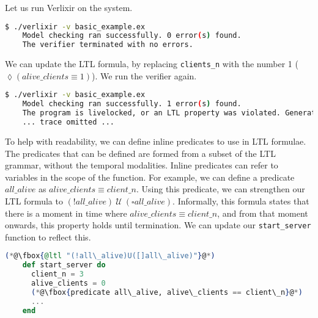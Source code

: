 Let us run Verlixir on the system.
\begin{lstlisting}[language=bash, xleftmargin=.3\linewidth]
    $ ./verlixir -v basic_example.ex
    Model checking ran successfully. 0 error(s) found.
    The verifier terminated with no errors.
\end{lstlisting}
We can update the LTL formula, by replacing \texttt{clients\_n} with the number 1 ($\lozenge (alive\_clients \equiv 1)$). We run the verifier again.
\begin{lstlisting}[language=bash, xleftmargin=.1\linewidth]
    $ ./verlixir -v basic_example.ex
    Model checking ran successfully. 1 error(s) found.
    The program is livelocked, or an LTL property was violated. Generating trace.
    ... trace omitted ...
\end{lstlisting}
To help with readability, we can define inline predicates to use in LTL formulae. The predicates that can be defined are formed from a subset of the LTL grammar, without the temporal modalities. Inline predicates can refer to variables in the scope of the function. For example, we can define a predicate \( all\_alive \) as $alive\_clients \equiv client\_n$. Using this predicate, we can strengthen our LTL formula to \( (!all\_alive) \ \mathcal{U} \ (\square all\_alive) \). Informally, this formula states that there is a moment in time where $alive\_clients \equiv client\_n$, and from that moment onwards, this property holds until termination. We can update our \texttt{start\_server} function to reflect this.
\begin{lstlisting}[language=Elixir, xleftmargin=.3\linewidth]
    (*@\fbox{@ltl "(!all\_alive)U([]all\_alive)"}@*)
    def start_server do
      client_n = 3
      alive_clients = 0
      (*@\fbox{predicate all\_alive, alive\_clients == client\_n}@*)
      ...
    end
\end{lstlisting}
